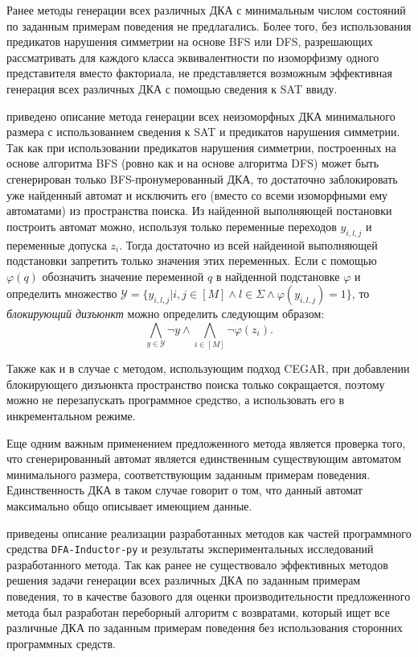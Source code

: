 Ранее методы генерации всех различных ДКА с минимальным числом состояний по заданным примерам поведения не предлагались. 
Более того, без использования предикатов нарушения симметрии на основе BFS или DFS, разрешающих рассматривать для каждого класса эквивалентности по изоморфизму одного представителя вместо факториала, не представляется возможным эффективная генерация всех различных ДКА с помощью сведения к SAT ввиду.

\insection{\ref{sec:findall:SAT-based}} приведено описание метода генерации всех неизоморфных ДКА минимального размера с использованием сведения к SAT и предикатов нарушения симметрии.
Так как при использовании предикатов нарушения симметрии, построенных на основе алгоритма BFS (ровно как и на основе алгоритма DFS) может быть сгенерирован только BFS-пронумерованный ДКА, то достаточно заблокировать уже найденный автомат и исключить его (вместо со всеми изоморфными ему автоматами) из пространства поиска.
Из найденной выполняющей постановки построить автомат можно, используя только переменные переходов $y_{i,l,j}$ и переменные допуска $z_{i}$.
Тогда достаточно из всей найденной выполняющей подстановки запретить только значения этих переменных.
Если с помощью $\varphi\left(q\right)$ обозначить значение переменной $q$ в найденной подстановке $\varphi$ и определить множество $\mathcal{Y} = \{y_{i,l,j} | i,j \in \left[M\right] \wedge l \in \Sigma \wedge \varphi\left(y_{i,l,j}\right) = 1\}$, то \emph{блокирующий дизъюнкт} можно определить следующим образом:
\begin{equation*}
\bigwedge_{y \in \mathcal{Y}} \neg y \wedge \bigwedge_{i \in \left[M\right]}\neg \varphi\left(z_{i}\right).
\end{equation*}

Также как и в случае с методом, использующим подход CEGAR, при добавлении блокирующего дизъюнкта пространство поиска только сокращается, поэтому можно не перезапускать программное средство, а использовать его в инкрементальном режиме.

Еще одним важным применением предложенного метода является проверка того, что сгенерированный автомат является единственным существующим автоматом минимального размера, соответствующим заданным примерам поведения.
Единственность ДКА в таком случае говорит о том, что данный автомат максимально общо описывает имеющием данные.

\insection{\ref{sec:findall:results}} приведены описание реализации разработанных методов как частей программного средства \texttt{DFA-Inductor-py} и результаты экспериментальных исследований разработанного метода. 
Так как ранее не существовало эффективных методов решения задачи генерации всех различных ДКА по заданным примерам поведения, то в качестве базового для оценки производительности предложенного метода был разработан переборный алгоритм с возвратами, который ищет все различные ДКА по заданным примерам поведения без использования сторонних программных средств.

